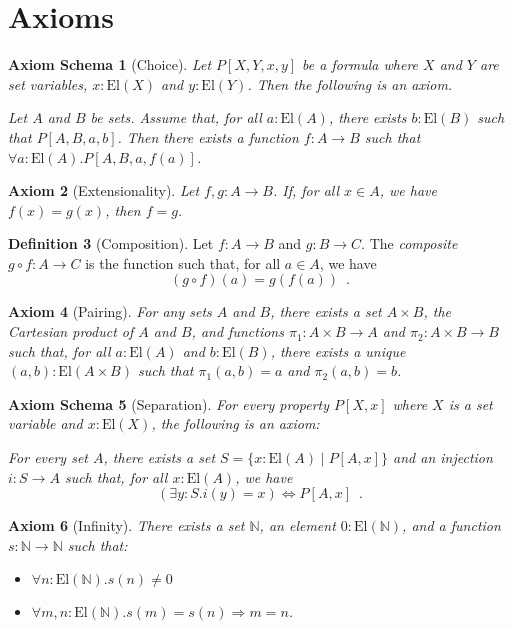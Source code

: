 \documentclass{book}
\newtheorem{ax}{Axiom}[section]
\newtheorem{axs}[ax]{Axiom Schema}
\theoremstyle{definition}
\newtheorem{df}[ax]{Definition}
\newcommand{\El}[1]{\ensuremath{\mathrm{El} \left( {#1} \right)}}
\begin{document}
\section{Axioms}

\begin{axs}[Choice]
Let $P[X,Y,x,y]$ be a formula where $X$ and $Y$ are set variables, $x : \El{X}$ and $y : \El{Y}$. Then the following is an axiom.

Let $A$ and $B$ be sets. Assume that, for all $a : \El{A}$, there exists $b : \El{B}$ such that $P[A,B,a,b]$. Then there exists a function $f : A \rightarrow B$ such that $\forall a : \El{A}. P[A,B,a,f(a)]$.
\end{axs}

\begin{ax}[Extensionality]
Let $f, g : A \rightarrow B$. If, for all $x \in A$, we have $f(x) = g(x)$, then $f = g$.
\end{ax}

\begin{df}[Composition]
Let $f : A \rightarrow B$ and $g : B \rightarrow C$. The \emph{composite} $g \circ f : A \rightarrow C$ is the function such that, for all $a \in A$, we have
\[ (g \circ f)(a) = g(f(a)) \enspace . \]
\end{df}

\begin{ax}[Pairing]
For any sets $A$ and $B$, there exists a set $A \times B$, the \emph{Cartesian product} of $A$ and $B$, and functions $\pi_1 : A \times B \rightarrow A$ and $\pi_2 : A \times B \rightarrow B$ such that, for all $a : \El{A}$ and $b : \El{B}$, there exists a unique $(a,b) : \El{A \times B}$ such that $\pi_1(a,b) = a$ and $\pi_2(a,b) = b$.
\end{ax}

\begin{axs}[Separation]
For every property $P[X,x]$ where $X$ is a set variable and $x : \El{X}$, the following is an axiom:

For every set $A$, there exists a set $S = \{ x : \El{A} \mid P[A,x] \}$ and an injection $i : S \rightarrow A$ such that, for all $x : \El{A}$, we have
\[ (\exists y : S. i(y) = x) \Leftrightarrow P[A,x] \enspace . \]
\end{axs}

\begin{ax}[Infinity]
There exists a set $\mathbb{N}$, an element $0 : \El{\mathbb{N}}$, and a function $s : \mathbb{N} \rightarrow \mathbb{N}$ such that:
\begin{itemize}
\item $\forall n : \El{\mathbb{N}}. s(n) \neq 0$
\item $\forall m,n : \El{\mathbb{N}}. s(m) = s(n) \Rightarrow m = n$.
\end{itemize}
\end{ax}
\end{document}

